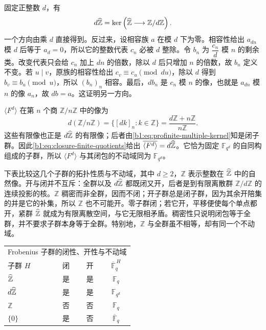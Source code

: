 \ProseParagraphBreak
固定正整数 \(d\)，有
\begin{equation}\label{b1:eq:profinite-multiple-kernel}
	d\widehat{\vphantom{Z}\mathbb Z} =\ker\left(\widehat{\vphantom{Z}\mathbb Z}\longrightarrow\mathbb Z/d\mathbb Z\right).
\end{equation}
一个方向由乘 \(d\) 直接得到。反过来，设相容族 \(a\) 在模 \(d\) 下为零。相容性给出 \(a_{dn}\) 模 \(d\) 后等于 \(a_d=0\)，所以它的整数代表 \(c_n\) 必被 \(d\) 整除。令 \(b_n\) 为 \(\dfrac{c_n}{d}\) 模 \(n\) 的剩余类。改变代表只会给 \(c_n\) 加上 \(dn\) 的倍数，除以 \(d\) 后只增加 \(n\) 的倍数，故 \(b_n\) 定义不变。若 \(u\mid v\)，原族的相容性给出 \(c_v\equiv c_u\pmod{du}\)，除以 \(d\) 得到 \(b_v\equiv b_u\pmod u\)，所以 \((b_n)_n\) 相容。最后，\(db_n\) 是 \(c_n\) 模 \(n\) 的像，也就是 \(a_{dn}\) 模 \(n\) 的像 \(a_n\)，故 \(db=a\)。这证明另一方向。

\ProseParagraphBreak
\(\langle F^d\rangle\) 在第 \(n\) 个商 \(\mathbb Z/n\mathbb Z\) 中的像为
\[
	d(\mathbb Z/n\mathbb Z)=\{[dk]_n:k\in\mathbb Z\} =\frac{d\mathbb Z+n\mathbb Z}{n\mathbb Z}.
\]
这些有限像也正是 \(d\widehat{\vphantom{Z}\mathbb Z}\) 的有限像；后者由\eqref{b1:eq:profinite-multiple-kernel}知是闭子群。因此\eqref{b1:eq:closure-finite-quotients}给出 \(\overline{\langle F^d\rangle}=d\widehat{\vphantom{Z}\mathbb Z}\)。它恰为固定 \(\mathbb F_{q^d}\) 的自同构组成的子群，所以 \(\langle F^d\rangle\) 与其闭包的不动域同为 \(\mathbb F_{q^d}\)。

\ProseParagraphBreak
下表比较这几个子群的拓扑性质与不动域，其中 \(d\geq2\)，\(\mathbb Z\) 表示整数在 \(\widehat{\vphantom{Z}\mathbb Z}\) 中的自然像。开与闭并不互斥：全群以及 \(d\widehat{\vphantom{Z}\mathbb Z}\) 都既闭又开，后者是到有限离散群 \(\mathbb Z/d\mathbb Z\) 的连续投影的核。\(\mathbb Z\) 稠密而非全群，因而不闭；开子群总是闭子群，因为其余开陪集的并是它的补集，所以 \(\mathbb Z\) 也不可能开。零子群闭；若它开，平移便使每个单点都开，紧群 \(\widehat{\vphantom{Z}\mathbb Z}\) 就成为有限离散空间，与它无限相矛盾。稠密性只说明闭包等于全群，并不要求子群本身等于全群。特别地，\(\mathbb Z\) 与全群虽不相等，却有同一个不动域。
\begin{center}
	\begin{tabular}{@{}lccc@{}}
		\multicolumn{4}{c}{Frobenius 子群的闭性、开性与不动域}\\
		\addlinespace[0.4em]
		\toprule
		子群 \(H\) & 闭 & 开 & \(\overline{\mathbb F}_q^{\,H}\) \\
		\midrule
		\(\widehat{\vphantom{Z}\mathbb Z}\) & 是 & 是 & \(\mathbb F_q\) \\
		\(d\widehat{\vphantom{Z}\mathbb Z}\) & 是 & 是 & \(\mathbb F_{q^d}\) \\
		\(\mathbb Z\) & 否 & 否 & \(\mathbb F_q\) \\
		\(\{0\}\) & 是 & 否 & \(\overline{\mathbb F}_q\) \\
		\bottomrule
	\end{tabular}
\end{center}

